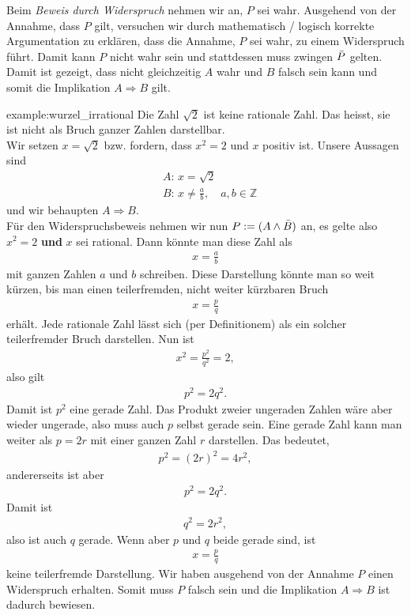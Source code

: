 \noindent
Beim \textit{Beweis durch Widerspruch} nehmen wir an, $P$  sei wahr. Ausgehend von der Annahme, dass $P$ gilt, versuchen wir durch mathematisch / logisch korrekte Argumentation zu erklären, dass die Annahme, $P$ sei wahr, zu einem Widerspruch führt. Damit kann $P$ nicht wahr sein und stattdessen muss zwingen $\Bar{P}$ gelten. Damit ist gezeigt, dass nicht gleichzeitig $A$ wahr und $B$ falsch sein kann und somit die Implikation $A\Rightarrow B$ gilt.
\begin{example}{example:wurzel_irrational}
	Die Zahl $\sqrt{2}$ ist keine rationale Zahl. Das heisst, sie ist nicht als Bruch ganzer Zahlen darstellbar.\\

	\noindent
	Wir setzen $x = \sqrt{2}$ bzw. fordern, dass $x^2 = 2$ und $x$ positiv ist. Unsere Aussagen sind
	\begin{align*}
		 & A: \, x = \sqrt{2}                               \\
		 & B: \, x \neq \frac{a}{b}, \quad a,b\in\mathbb{Z}
	\end{align*}
	und wir behaupten $A\Rightarrow B$.\\
	Für den Widerspruchsbeweis nehmen wir nun $P:= (A\land \Bar{B})$ an, es gelte also $x^2 = 2$ \textbf{und} $x$ sei rational. Dann könnte man diese Zahl als
	\begin{align*}
		x = \frac{a}{b}
	\end{align*}
	mit ganzen Zahlen $a$ und $b$ schreiben. Diese Darstellung könnte man so weit kürzen, bis man einen teilerfremden, nicht weiter kürzbaren Bruch
	\begin{align*}
		x = \frac{p}{q}
	\end{align*}
	erhält. Jede rationale Zahl lässt sich (per Definitionem) als ein solcher teilerfremder Bruch darstellen. Nun ist
	\begin{align*}
		x^2 = \frac{p^2}{q^2} = 2,
	\end{align*}
	also gilt
	\begin{align*}
		p^2 = 2q^2.
	\end{align*}
	Damit ist $p^2$ eine gerade Zahl. Das Produkt zweier ungeraden Zahlen wäre aber wieder ungerade, also muss auch $p$ selbst gerade sein. Eine gerade Zahl kann man weiter als $p=2r$ mit einer ganzen Zahl $r$ darstellen. Das bedeutet,
	\begin{align*}
		p^2 = (2r)^2 = 4r^2,
	\end{align*}
	andererseits ist aber
	\begin{align*}
		p^2 = 2q^2.
	\end{align*}
	Damit ist
	\begin{align*}
		q^2 = 2r^2,
	\end{align*}
	also ist auch $q$ gerade. Wenn aber $p$ und $q$ beide gerade sind, ist
	\begin{align*}
		x = \frac{p}{q}
	\end{align*}
	keine teilerfremde Darstellung. Wir haben ausgehend von der Annahme $P$ einen Widerspruch erhalten. Somit muss $P$ falsch sein und die Implikation $A\Rightarrow B$ ist dadurch bewiesen.
\end{example}
